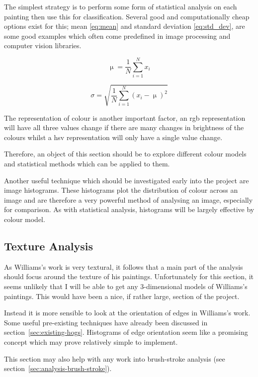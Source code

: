 The simplest strategy is to perform some form of statistical analysis on each painting then use
this for classification. Several good and computationally cheap options exist for this; 
mean \eqref{eq:mean} and standard deviation \eqref{eq:std_dev}, are some good
examples which often come predefined in image processing and computer vision libraries.

\begin{equation}\label{eq:mean}
\upmu = \frac{1}{N}\sum_{i=1}^{N}x_i
\end{equation}

\begin{equation}\label{eq:std_dev}
\sigma = \sqrt{\frac{1}{N}\sum_{i=1}^{N}(x_i - \upmu)^2}
\end{equation}

The representation of colour is another important factor, an \gls{rgb} representation will have all 
three values change if there are many changes in brightness of the colours whilst a \gls{hsv} 
representation will only have a single value change.

Therefore, an object of this section should be to explore different colour models and statistical
methods which can be applied to them.

Another useful technique which should be investigated early into the project are image histograms.
These histograms plot the distribution of colour across an image and are therefore a very powerful
method of analysing an image, especially for comparison. As with statistical analysis, histograms
will be largely effective by colour model.

\subsection{Texture Analysis}
As Williams's work is very textural, it follows that a main part of the analysis should
focus around the texture of his paintings. Unfortunately for this section, it seems unlikely that
I will be able to get any 3-dimensional models of Williams's paintings. This would have been a nice,
if rather large, section of the project.

Instead it is more sensible to look at the orientation of edges in Williams's work. Some useful 
pre-existing techniques have already been discussed in section~\ref{sec:existing-hogs}. Histograms
of edge orientation\cite{Dalal2005Histograms} seem like a promising concept which may prove 
relatively simple to implement.

This section may also help with any work into brush-stroke analysis (see 
section~\ref{sec:analysis-brush-stroke}).

